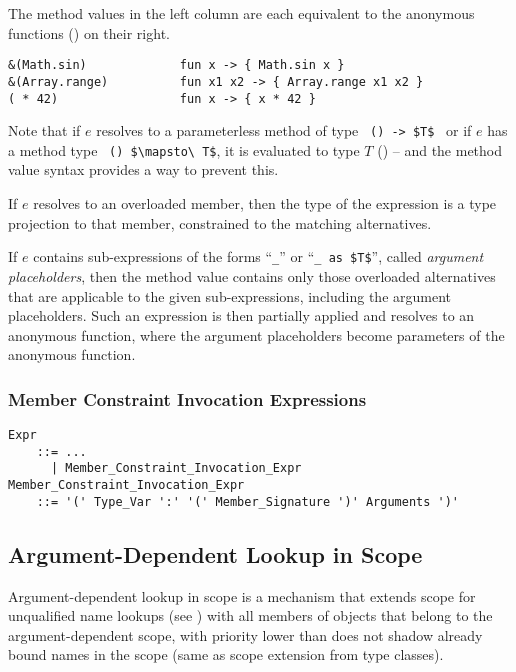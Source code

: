 \example The method values in the left column are each equivalent to the anonymous functions () on their right. 
\begin{lstlisting}[deletekeywords={range}]
&(Math.sin)             fun x -> { Math.sin x }
&(Array.range)          fun x1 x2 -> { Array.range x1 x2 }
( * 42)                 fun x -> { x * 42 }
\end{lstlisting}

Note that if $e$ resolves to a parameterless method of type ~\lstinline!() -> $T$!~ or if $e$ has a method type ~\lstinline!() $\mapsto\ T$!, it is evaluated to type $T$ () -- and the method value syntax provides a way to prevent this. 

If $e$ resolves to an overloaded member, then the type of the expression is a type projection to that member, constrained to the matching alternatives. 

If $e$ contains sub-expressions of the forms ``\lstinline!_!'' or ``\lstinline!_ as $T$!'', called {\em argument placeholders}, then the method value contains only those overloaded alternatives that are applicable to the given sub-expressions, including the argument placeholders. Such an expression is then partially applied and resolves to an anonymous function, where the argument placeholders become parameters of the anonymous function. 





\subsubsection{Member Constraint Invocation Expressions}

\grammar\begin{lstlisting}
Expr
    ::= ...
      | Member_Constraint_Invocation_Expr
Member_Constraint_Invocation_Expr
    ::= '(' Type_Var ':' '(' Member_Signature ')' Arguments ')'
\end{lstlisting}





\subsection{Argument-Dependent Lookup in Scope}
\label{sec:adl-scope}

Argument-dependent lookup in scope is a mechanism that extends scope for unqualified name lookups (see ) with all members of objects that belong to the argument-dependent scope, with priority lower than does not shadow already bound names in the scope (same as scope extension from type classes).  


